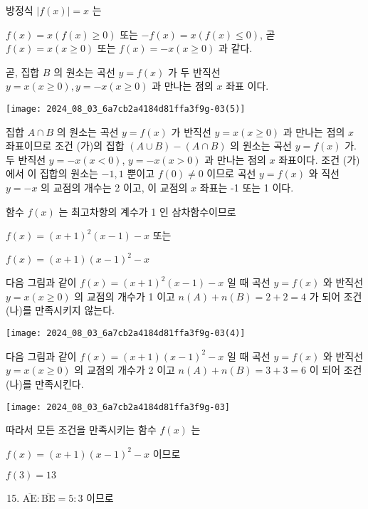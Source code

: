 \documentclass[10pt]{article}
\begin{document}
방정식 \(|f(x)|=x\) 는

\(f(x)=x(f(x) \geq 0)\) 또는 \(-f(x)=x(f(x) \leq 0)\), 곧 \(f(x)=x(x \geq 0)\) 또는 \(f(x)=-x(x \geq 0)\) 과 같다.

곧, 집합 \(B\) 의 원소는 곡선 \(y=f(x)\) 가 두 반직선 \(y=x(x \geq 0), y=-x(x \geq 0)\) 과 만나는 점의 \(x\) 좌표 이다.

\begin{center}
\texttt{[image: 2024\_08\_03\_6a7cb2a4184d81ffa3f9g-03(5)]}
\end{center}

집합 \(A \cap B\) 의 원소는 곡선 \(y=f(x)\) 가 반직선 \(y=x(x \geq 0)\) 과 만나는 점의 \(x\) 좌표이므로 조건 (가)의 집합 \((A \cup B)-(A \cap B)\) 의 원소는 곡선 \(y=f(x)\) 가. 두 반직선 \(y=-x(x<0)\), \(y=-x(x>0)\) 과 만나는 점의 \(x\) 좌표이다. 조건 (가)에서 이 집합의 원소는 \(-1,1\) 뿐이고 \(f(0) \neq 0\) 이므로 곡선 \(y=f(x)\) 와 직선 \(y=-x\) 의 교점의 개수는 2 이고, 이 교점의 \(x\) 좌표는 -1 또는 1 이다.

함수 \(f(x)\) 는 최고차항의 계수가 1 인 삼차함수이므로

\(f(x)=(x+1)^{2}(x-1)-x\) 또는

\(f(x)=(x+1)(x-1)^{2}-x\)

다음 그림과 같이 \(f(x)=(x+1)^{2}(x-1)-x\) 일 때 곡선 \(y=f(x)\) 와 반직선 \(y=x(x \geq 0)\) 의 교점의 개수가 1 이고 \(n(A)+n(B)=2+2=4\) 가 되어 조건 (나)를 만족시키지 않는다.

\begin{center}
\texttt{[image: 2024\_08\_03\_6a7cb2a4184d81ffa3f9g-03(4)]}
\end{center}

다음 그림과 같이 \(f(x)=(x+1)(x-1)^{2}-x\) 일 때 곡선 \(y=f(x)\) 와 반직선 \(y=x(x \geq 0)\) 의 교점의 개수가 2 이고 \(n(A)+n(B)=3+3=6\) 이 되어 조건 (나)를 만족시킨다.

\begin{center}
\texttt{[image: 2024\_08\_03\_6a7cb2a4184d81ffa3f9g-03]}
\end{center}

따라서 모든 조건을 만족시키는 함수 \(f(x)\) 는

\(f(x)=(x+1)(x-1)^{2}-x\) 이므로

\(f(3)=13\)

\begin{enumerate}
  \setcounter{enumi}{14}
  \item \(\overline{\mathrm{AE}}: \overline{\mathrm{BE}}=5: 3\) 이므로
\end{enumerate}
\end{document}
